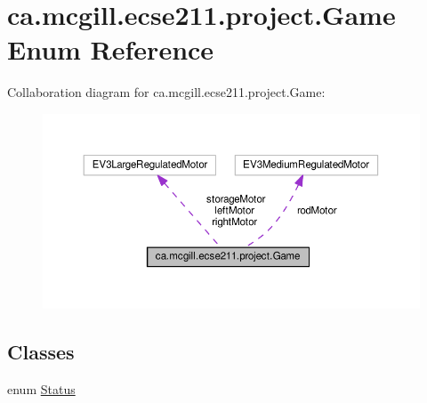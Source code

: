\hypertarget{enumca_1_1mcgill_1_1ecse211_1_1project_1_1_game}{}\section{ca.\+mcgill.\+ecse211.\+project.\+Game Enum Reference}
\label{enumca_1_1mcgill_1_1ecse211_1_1project_1_1_game}


Collaboration diagram for ca.\+mcgill.\+ecse211.\+project.\+Game\+:\nopagebreak
\begin{figure}[H]
\begin{center}
\leavevmode
\includegraphics[width=350pt]{enumca_1_1mcgill_1_1ecse211_1_1project_1_1_game__coll__graph}
\end{center}
\end{figure}
\subsection*{Classes}
\begin{DoxyCompactItemize}
\item 
enum \hyperlink{enumca_1_1mcgill_1_1ecse211_1_1project_1_1_game_1_1_status}{Status}
\end{DoxyCompactItemize}

